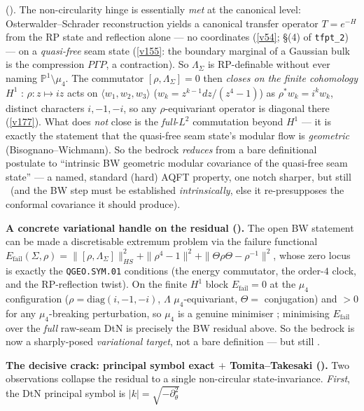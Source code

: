 \documentclass[11pt,a4paper]{article}
\newcommand{\PP}{\mathbb P^1}
\begin{document}
\begin{keybox}
{().} The non-circularity hinge is essentially \emph{met} at the canonical
level: Osterwalder--Schrader reconstruction yields a canonical transfer operator $T=e^{-H}$ from the RP
state and reflection alone --- no coordinates (\vref{v54}; \S(4) of \texttt{tfpt\_2}) --- on a
\emph{quasi-free} seam state (\vref{v155}: the boundary marginal of a Gaussian bulk is the compression
$P\Gamma P$, a contraction). So $\Lambda_\Sigma$ is RP-definable without ever naming $\PP\!\setminus\!\mu_4$.
The commutator $[\rho,\Lambda_\Sigma]=0$ then \emph{closes on the finite cohomology} $H^1$ \mE: $\rho\!:\!z\mapsto iz$
acts on $\langle w_1,w_2,w_3\rangle$ ($w_k=z^{k-1}dz/(z^4-1)$) as $\rho^*w_k=i^k w_k$, distinct characters
$i,-1,-i$, so any $\rho$-equivariant operator is diagonal there (\vref{v177}). What does \emph{not} close is
the \emph{full}-$L^2$ commutation beyond $H^1$ --- it is exactly the statement that the quasi-free seam
state's modular flow is \emph{geometric} (Bisognano--Wichmann). So the bedrock \emph{reduces} from a bare
definitional postulate to ``intrinsic BW geometric modular covariance of the quasi-free seam state'' --- a
named, standard (hard) AQFT property, one notch sharper, but still \mO\ (and the BW step must be established
\emph{intrinsically}, else it re-presupposes the conformal covariance it should produce).
\par\smallskip\noindent\textbf{A concrete variational handle on the residual ().}
The open BW statement can be made a discretisable extremum problem via the failure functional
$E_{\mathrm{fail}}(\Sigma,\rho)=\|[\rho,\Lambda_\Sigma]\|_{HS}^2+\|\rho^4-1\|^2+\|\Theta\rho\Theta-\rho^{-1}\|^2$,
whose zero locus is exactly the \texttt{QGEO.SYM.01} conditions (the energy commutator, the order-$4$ clock,
and the RP-reflection twist). On the finite $H^1$ block $E_{\mathrm{fail}}=0$ at the $\mu_4$ configuration
($\rho=\mathrm{diag}(i,-1,-i)$, $\Lambda$ $\mu_4$-equivariant, $\Theta=$ conjugation) and $>0$ for any
$\mu_4$-breaking perturbation, so $\mu_4$ is a genuine minimiser \mE; minimising $E_{\mathrm{fail}}$ over
the \emph{full} raw-seam DtN is precisely the BW residual above. So the bedrock is now a sharply-posed
\emph{variational target}, not a bare definition --- but still \mO.
\par\smallskip\noindent\textbf{The decisive crack: principal symbol exact $+$ Tomita--Takesaki
().} Two observations collapse the residual to a single
non-circular state-invariance. \emph{First}, the DtN principal symbol is $|k|=\sqrt{-\partial_\theta^2}$

\end{keybox}
\end{document}
